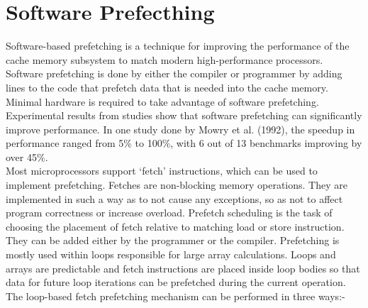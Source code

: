 \documentclass{article}
\begin{document}
\section{Software Prefecthing}
Software-based prefetching is a technique for improving the performance of the cache memory subsystem to match modern high-performance processors. Software prefetching is done by either the compiler or programmer by adding lines to the code that prefetch data that is needed into the cache memory. Minimal hardware is required to take advantage of software prefetching. Experimental results from studies show that software prefetching can significantly improve performance. In one study done by Mowry et al. (1992), the speedup in performance ranged from 5\% to 100\%, with 6 out of 13 benchmarks improving by over 45\%.
\\Most microprocessors support ‘fetch’ instructions, which can be used to implement prefetching. Fetches are non-blocking memory operations. They are implemented in such a way as to not cause any exceptions, so as not to affect program correctness or increase overload. Prefetch scheduling is the task of choosing the placement of fetch relative to matching load or store instruction. They can be added either by the programmer or the compiler. Prefetching is mostly used within loops responsible for large array calculations. Loops and arrays are predictable and fetch instructions are placed inside loop bodies so that data for future loop iterations can be prefetched during the current operation.
\\The loop-based fetch prefetching mechanism can be performed in three ways:-
\end{document}
